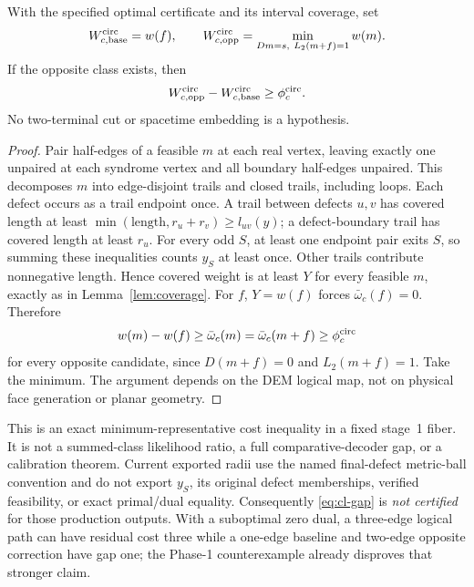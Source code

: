 \begin{theorem}\label{thm:cl-gap}
With the specified optimal certificate and its interval coverage, set
\[
 W_{c,\mathrm{base}}^{\rm circ}=w(f),\qquad
 W_{c,\mathrm{opp}}^{\rm circ}
 =\min_{Dm=s,\ L_2(m+f)=1}w(m).
\]
If the opposite class exists, then
\begin{equation}
 W_{c,\mathrm{opp}}^{\rm circ}-W_{c,\mathrm{base}}^{\rm circ}
 \ge\phi_c^{\rm circ}.                              \label{eq:cl-gap}
\end{equation}
No two-terminal cut or spacetime embedding is a hypothesis.
\end{theorem}
\begin{proof}
Pair half-edges of a feasible $m$ at each real vertex, leaving exactly
one unpaired at each syndrome vertex and all boundary half-edges
unpaired. This decomposes $m$ into edge-disjoint trails and closed trails,
including loops. Each defect occurs as a trail endpoint once. A trail
between defects $u,v$ has covered length at least
$\min(\text{length},r_u+r_v)\ge l_{uv}(y)$; a defect-boundary trail has
covered length at least $r_u$. For every odd $S$, at least one endpoint
pair exits $S$, so summing these inequalities counts $y_S$ at least once.
Other trails contribute nonnegative length. Hence covered weight is at
least $Y$ for every feasible $m$, exactly as in Lemma~\ref{lem:coverage}.
For $f$, $Y=w(f)$ forces $\bar\omega_c(f)=0$. Therefore
\[
 w(m)-w(f)\ge\bar\omega_c(m)
 =\bar\omega_c(m+f)\ge\phi_c^{\rm circ}
\]
for every opposite candidate, since $D(m+f)=0$ and $L_2(m+f)=1$.
Take the minimum. The argument depends on the DEM logical map, not on
physical face generation or planar geometry.
\end{proof}
This is an exact minimum-representative cost inequality in a fixed
stage~1 fiber. It is not a summed-class likelihood ratio, a full
comparative-decoder gap, or a calibration theorem. Current exported
radii use the named final-defect metric-ball convention and do not export
$y_S$, its original defect memberships, verified feasibility, or exact
primal/dual equality. Consequently \eqref{eq:cl-gap} is \emph{not certified}
for those production outputs. With a suboptimal zero dual, a three-edge
logical path can have residual cost three while a one-edge baseline and
two-edge opposite correction have gap one; the Phase-1 counterexample
already disproves that stronger claim.

